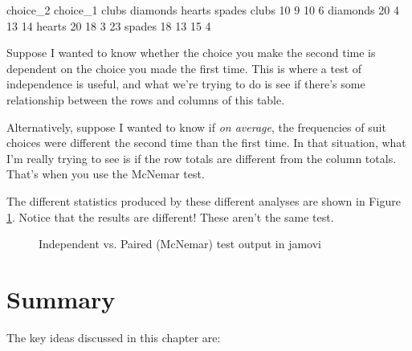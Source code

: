 \begin{rblock1}
          choice_2
choice_1   clubs diamonds hearts spades
  clubs       10        9     10      6
  diamonds    20        4     13     14
  hearts      20       18      3     23
  spades      18       13     15      4
\end{rblock1}

Suppose I wanted to know whether the choice you make the second time is dependent on the choice you made the first time. This is where a test of independence is useful, and what we're trying to do is see if there's some relationship between the rows and columns of this table. 

Alternatively, suppose I wanted to know if {\it on average}, the frequencies of suit choices were different the second time than the first time. In that situation, what I'm really trying to see is if the row totals are different from the column totals. That's when you use the McNemar test.

The different statistics produced by these different analyses are shown in Figure \ref{fig:ind_paired}. 
Notice that the results are different! These aren't the same test. 

\begin{figure}[p]
\begin{center}
\caption{Independent vs. Paired (McNemar) test output in jamovi}
\label{fig:ind_paired}
\HR
\end{center}
\end{figure}

\vspace{0.5cm}
\section{Summary}

The key ideas discussed in this chapter are:

